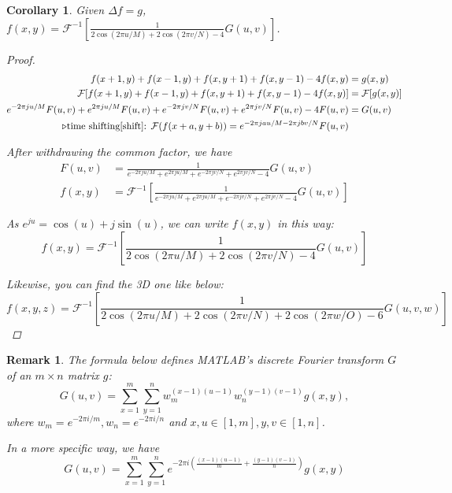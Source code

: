 \documentclass[a4paper]{article}
\theoremstyle{definition}
\theoremstyle{plain}
\newtheorem{remark}{Remark}
\newtheorem{corollary}{Corollary}
\begin{document}
\begin{corollary}
Given $\Delta f=g$, $f(x,y)=\mathcal{F}^{-1}\left[\frac{1}{2\cos(2\pi u/M)+2\cos(2\pi v/N)-4}G(u,v)\right]$.
\begin{proof}
\begin{align*}
    f(x+1,y)+f(x-1,y)+f(x,y+1)+f(x,y-1)-4f(x,y)&=g(x,y)\\
    \mathcal{F}[f(x+1,y)+f(x-1,y)+f(x,y+1)+f(x,y-1)-4f(x,y)]&=\mathcal{F}[g(x,y)]\\
    e^{-2\pi ju/M}F(u,v)+e^{2\pi ju/M}F(u,v)+e^{-2\pi jv/N}F(u,v)+e^{2\pi jv/N}F(u,v)-4F(u,v)&=G(u,v)\\
    \triangleright\text{time shifting\cite{shift}: }\mathcal{F}(f(x+a,y+b))=e^{-2\pi jau/M-2\pi jbv/N}F(u,v)
\end{align*}

After withdrawing the common factor, we have
\begin{align*}
    F(u,v)&=\frac{1}{e^{-2\pi ju/M}+e^{2\pi ju/M}+e^{-2\pi jv/N}+e^{2\pi jv/N}-4}G(u,v)\\
    f(x,y)&=\mathcal{F}^{-1}\left[\frac{1}{e^{-2\pi ju/M}+e^{2\pi ju/M}+e^{-2\pi jv/N}+e^{2\pi jv/N}-4}G(u,v)\right]
\end{align*}

As $e^{ju}=\cos(u)+j\sin(u)$, we can write $f(x,y)$ in this way:
\begin{equation*}
    f(x,y)=\mathcal{F}^{-1}\left[\frac{1}{2\cos(2\pi u/M)+2\cos(2\pi v/N)-4}G(u,v)\right]
\end{equation*}

Likewise, you can find the 3D one like below:
\begin{equation*}
    f(x,y,z)=\mathcal{F}^{-1}\left[\frac{1}{2\cos(2\pi u/M)+2\cos(2\pi v/N)+2\cos(2\pi w/O)-6}G(u,v,w)\right]
\end{equation*}
\end{proof}
\end{corollary}

\begin{remark}
The formula below defines MATLAB's discrete Fourier transform $G$ of an $m\times n$ matrix $g$:
\begin{equation*}
    G(u,v)=\sum^{m}_{x=1}\sum^{n}_{y=1}w^{(x-1)(u-1)}_mw^{(y-1)(v-1)}_ng(x,y),
\end{equation*}
where $w_m=e^{-2\pi i/m},w_n=e^{-2\pi i/n}$ and $x,u\in[1,m], y,v\in[1,n]$.

In a more specific way, we have
\begin{equation*}
    G(u,v)=\sum^{m}_{x=1}\sum^{n}_{y=1}e^{-2\pi i\left(\frac{(x-1)(u-1)}{m}+\frac{(y-1)(v-1)}{n}\right)}g(x,y)
\end{equation*}
\end{remark}
\end{document}
